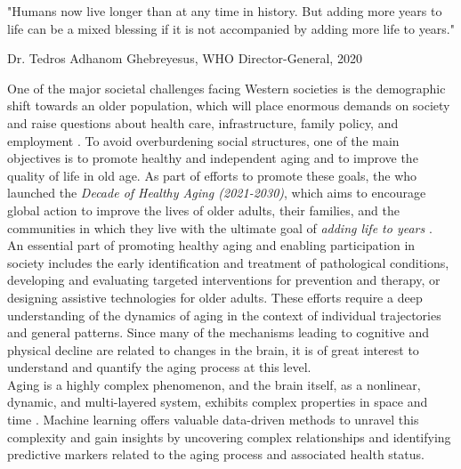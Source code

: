 \setlength{\epigraphwidth}{0.6\textwidth}
\epigraph{\centering "Humans now live longer than at any time in history. But adding more years to life can be a mixed blessing if it is not accompanied by adding more life to years."} {Dr. Tedros Adhanom Ghebreyesus, WHO Director-General, 2020}

\noindent One of the major societal challenges facing Western societies is the demographic shift towards an older population, which will place enormous demands on society and raise questions about health care, infrastructure, family policy, and employment \cite{WHO_DECADE2020}. To avoid overburdening social structures, one of the main objectives is to promote healthy and independent aging and to improve the quality of life in old age. As part of efforts to promote these goals, the \gls{who} launched the \textit{Decade of Healthy Aging (2021-2030)}, which aims to encourage global action to improve the lives of older adults, their families, and the communities in which they live with the ultimate goal of \textit{adding life to years} \cite{WHO_DECADE2020}.\\
An essential part of promoting healthy aging and enabling participation in society includes the early identification and treatment of pathological conditions, developing and evaluating targeted interventions for prevention and therapy, or designing assistive technologies for older adults. These efforts require a deep understanding of the dynamics of aging in the context of individual trajectories and general patterns. Since many of the mechanisms leading to cognitive and physical decline are related to changes in the brain, it is of great interest to understand and quantify the aging process at this level.\\
Aging is a highly complex phenomenon, and the brain itself, as a nonlinear, dynamic, and multi-layered system, exhibits complex properties in space and time \cite{Betzel2017}. Machine learning offers valuable data-driven methods to unravel this complexity and gain insights by uncovering complex relationships and identifying predictive markers related to the aging process and associated health status.\\
